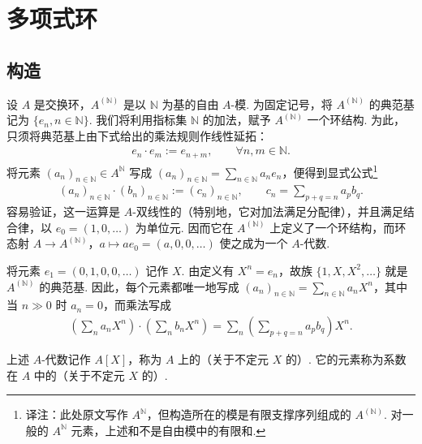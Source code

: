 \section{多项式环}\label{sec:galois-1-4}
\subsection{构造}\label{sec:galois-1-4-1}
设 $A$ 是交换环，$A^{(\mathbb N)}$ 是以 $\mathbb N$ 为基的自由 $A$-模. 为固定记号，将 $A^{(\mathbb N)}$ 的典范基记为 $\{e_n,n\in\mathbb N\}$. 我们将利用指标集 $\mathbb N$ 的加法，赋予 $A^{(\mathbb N)}$ 一个环结构. 为此，只须将典范基上由下式给出的乘法规则作线性延拓：
\begin{align*}
e_n\cdot e_m:=e_{n+m},\qquad \forall n,m\in\mathbb N.
\end{align*}
将元素 $(a_n)_{n\in\mathbb N}\in A^{\mathbb N}$ 写成 $(a_n)_{n\in\mathbb N}=\sum_{n\in\mathbb N}a_ne_n$，便得到显式公式\footnote{译注：此处原文写作 $A^{\mathbb N}$，但构造所在的模是有限支撑序列组成的 $A^{(\mathbb N)}$. 对一般的 $A^{\mathbb N}$ 元素，上述和不是自由模中的有限和.}
\begin{align*}
(a_n)_{n\in\mathbb N}\cdot(b_n)_{n\in\mathbb N}:=(c_n)_{n\in\mathbb N},\qquad c_n=\sum_{p+q=n}a_pb_q.
\end{align*}
容易验证，这一运算是 $A$-双线性的（特别地，它对加法满足分配律），并且满足结合律，以 $e_0=(1,0,\ldots)$ 为单位元. 因而它在 $A^{(\mathbb N)}$ 上定义了一个环结构，而环态射 $A\longrightarrow A^{(\mathbb N)}$，$a\longmapsto ae_0=(a,0,0,\ldots)$ 使之成为一个 $A$-代数.

将元素 $e_1=(0,1,0,0,\ldots)$ 记作 $X$. 由定义有 $X^n=e_n$，故族 $\{1,X,X^2,\ldots\}$ 就是 $A^{(\mathbb N)}$ 的典范基. 因此，每个元素都唯一地写成 $(a_n)_{n\in\mathbb N}=\sum_{n\in\mathbb N}a_nX^n$，其中当 $n\gg0$ 时 $a_n=0$，而乘法写成
\begin{align*}
\left(\sum_n a_nX^n\right)\cdot\left(\sum_n b_nX^n\right)=\sum_n\left(\sum_{p+q=n}a_pb_q\right)X^n.
\end{align*}
\begin{definition*}
上述 $A$-代数记作 $A[X]$，称为 $A$ 上的（关于不定元 $X$ 的）. 它的元素称为系数在 $A$ 中的（关于不定元 $X$ 的）.
\end{definition*}

